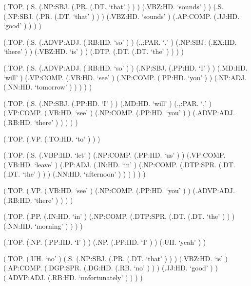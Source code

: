 \documentclass[10pt]{article}
\begin{document}
\begin{parsetree}  (.TOP. (.S. (.NP:SBJ. (.PR. (.DT. `that' ) ) ) (.VBZ:HD. `sounds' ) ) (.S. (.NP:SBJ. (.PR. (.DT. `that' ) ) ) (.VBZ:HD. `sounds' ) (.AP:COMP. (.JJ:HD. `good' ) ) ) ) \end{parsetree}

\begin{parsetree}  (.TOP. (.S. (.ADVP:ADJ. (.RB:HD. `so' ) ) (.,:PAR. `,' ) (.NP:SBJ. (.EX:HD. `there' ) ) (.VBZ:HD. `is' ) ) (.DTP. (.DT. (.DT. `the' ) ) ) ) \end{parsetree}

\begin{parsetree}  (.TOP. (.S. (.ADVP:ADJ. (.RB:HD. `so' ) ) (.NP:SBJ. (.PP:HD. `I' ) ) (.MD:HD. `will' ) (.VP:COMP. (.VB:HD. `see' ) (.NP:COMP. (.PP:HD. `you' ) ) (.NP:ADJ. (.NN:HD. `tomorrow' ) ) ) ) ) \end{parsetree}

\begin{parsetree}  (.TOP. (.S. (.NP:SBJ. (.PP:HD. `I' ) ) (.MD:HD. `will' ) (.,:PAR. `,' ) (.VP:COMP. (.VB:HD. `see' ) (.NP:COMP. (.PP:HD. `you' ) ) (.ADVP:ADJ. (.RB:HD. `there' ) ) ) ) ) \end{parsetree}

\begin{parsetree}  (.TOP. (.VP. (.TO:HD. `to' ) ) ) \end{parsetree}

\begin{parsetree}  (.TOP. (.S. (.VBP:HD. `let' ) (.NP:COMP. (.PP:HD. `us' ) ) (.VP:COMP. (.VB:HD. `leave' ) (.PP:ADJ. (.IN:HD. `in' ) (.NP:COMP. (.DTP:SPR. (.DT. (.DT. `the' ) ) ) (.NN:HD. `afternoon' ) ) ) ) ) ) \end{parsetree}

\begin{parsetree}  (.TOP. (.VP. (.VB:HD. `see' ) (.NP:COMP. (.PP:HD. `you' ) ) (.ADVP:ADJ. (.RB:HD. `there' ) ) ) ) \end{parsetree}

\begin{parsetree}  (.TOP. (.PP. (.IN:HD. `in' ) (.NP:COMP. (.DTP:SPR. (.DT. (.DT. `the' ) ) ) (.NN:HD. `morning' ) ) ) ) \end{parsetree}

\begin{parsetree}  (.TOP. (.NP. (.PP:HD. `I' ) ) (.NP. (.PP:HD. `I' ) ) (.UH. `yeah' ) ) \end{parsetree}

\begin{parsetree}  (.TOP. (.UH. `no' ) (.S. (.NP:SBJ. (.PR. (.DT. `that' ) ) ) (.VBZ:HD. `is' ) (.AP:COMP. (.DGP:SPR. (.DG:HD. (.RB. `no' ) ) ) (.JJ:HD. `good' ) ) (.ADVP:ADJ. (.RB:HD. `unfortunately' ) ) ) ) \end{parsetree}
\end{document}
